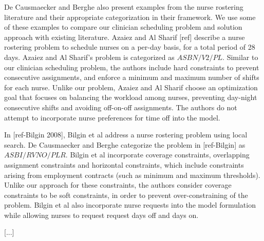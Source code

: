 De Causmaecker and Berghe also present examples from the nurse rostering literature
and their appropriate categorization in their framework. We use some of these examples
to compare our clinician
scheduling problem and solution approach with existing literature. Azaiez and Al Sharif [ref]
describe a nurse rostering problem to schedule nurses on a per-day basis, for a total period
of 28 days. Azaiez and Al Sharif's problem is categorized as $ASBN/V2/PL$.
Similar to our clinician scheduling problem, the authors include hard constraints
to prevent consecutive assignments, and enforce a minimum and maximum number of shifts for each nurse.
Unlike our problem, Azaiez and Al Sharif choose an optimization goal that focuses on
balancing the workload among nurses, preventing day-night consecutive shifts and 
avoiding off-on-off assignments. The authors do not attempt to incorporate nurse preferences
for time off into the model. 

In [ref-Bilgin 2008], Bilgin et al address a nurse rostering problem using local search.
De Causmaecker and Berghe categorize the problem in [ref-Bilgin] as $ASBI/RVNO/PLR$.
Bilgin et al incorporate coverage constraints, overlapping assignment constraints
and horizontal constraints, which include constraints arising from employment contracts
(such as minimum and maximum thresholds).
Unlike our approach for these constraints, the authors consider coverage constraints to be soft
constraints, in order to prevent over-constraining of the problem.
Bilgin et al also incorporate nurse requests into the model formulation while allowing
nurses to request request days off and days on.

[...]
